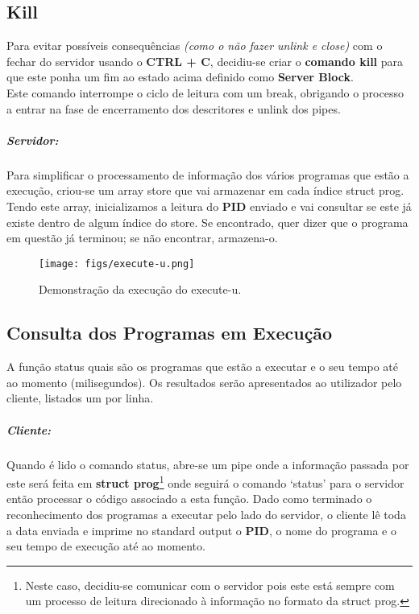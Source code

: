 \documentclass{report}
\begin{document}
\subsection{Kill}
Para evitar possíveis consequências \textit{(como o não fazer unlink e close)} com o fechar do servidor usando o \textbf{CTRL + C}, decidiu-se criar o \textbf{comando kill} para que este ponha um fim ao estado acima definido como \textbf{Server Block}.\\
Este comando interrompe o ciclo de leitura com um break, obrigando o processo a entrar na fase de encerramento dos descritores e unlink dos pipes.

\subparagraph{Servidor:}

Para simplificar o processamento de informação dos vários programas que estão a execução, criou-se um array store que vai armazenar em cada índice struct prog. Tendo este array, inicializamos a leitura do \textbf{PID} enviado e vai consultar se este já existe dentro de algum índice do store. Se encontrado, quer dizer que o programa em questão já terminou; se não encontrar, armazena-o.\\ 

\begin{figure}[b]
    \centering
    \texttt{[image: figs/execute-u.png]}
    \caption{Demonstração da execução do execute-u.}
    \label{f}
\end{figure}

\newpage
\subsection{Consulta dos Programas em Execução}
A função status quais são os programas que estão a executar e o seu tempo até ao momento (milisegundos). Os resultados serão apresentados ao utilizador pelo cliente, listados um por linha.

\subparagraph{Cliente:}

Quando é lido o comando status, abre-se um pipe onde a informação passada por este será feita em \textbf{struct prog}\footnote{Neste caso, decidiu-se comunicar com o servidor pois este está sempre com um processo de leitura direcionado à informação no formato da struct prog.} onde seguirá o comando ‘status’ para o servidor então processar o código associado a esta função. Dado como terminado o reconhecimento dos programas a executar pelo lado do servidor, o cliente lê toda a data enviada e imprime no standard output o \textbf{PID}, o nome do programa e o seu tempo de execução até ao momento.
\end{document}
